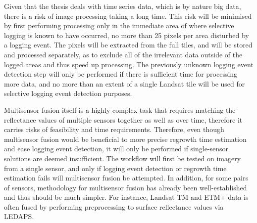 \documentclass[a4paper,10pt]{article}
\begin{document}
Given that the thesis deals with time series data, which is by nature big data, there is a risk of image processing taking a long time. This risk will be minimised by first performing processing only in the immediate area of where selective logging is known to have occurred, no more than 25 pixels per area disturbed by a logging event. The pixels will be extracted from the full tiles, and will be stored and processed separately, as to exclude all of the irrelevant data outside of the logged areas and thus speed up processing. The previously unknown logging event detection step will only be performed if there is sufficient time for processing more data, and no more than an extent of a single Landsat tile will be used for selective logging event detection purposes.

Multisensor fusion itself is a highly complex task that requires matching the reflectance values of multiple sensors together as well as over time, therefore it carries risks of feasibility and time requirements. Therefore, even though multisensor fusion would be beneficial to more precise regrowth time estimation and ease logging event detection, it will only be performed if single-sensor solutions are deemed insufficient. The workflow will first be tested on imagery from a single sensor, and only if logging event detection or regrowth time estimation fails will multisensor fusion be attempted. In addition, for some pairs of sensors, methodology for multisensor fusion has already been well-established and thus should be much simpler. For instance, Landsat TM and ETM+ data is often fused by performing preprocessing to surface reflectance values via LEDAPS.

\printnoidxglossary[type=acronym]


\end{document}
